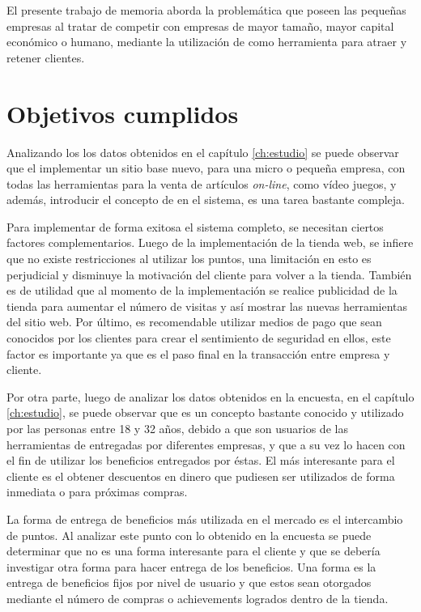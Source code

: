 El presente trabajo de memoria aborda la problemática que poseen las pequeñas
empresas al tratar de competir con empresas de mayor tamaño, mayor capital
económico o humano, mediante la utilización de {\gam} como herramienta para atraer
y retener clientes.

\section{Objetivos cumplidos}

Analizando los los datos obtenidos en el capítulo \ref{ch:estudio} se puede observar que el
implementar un sitio base nuevo, para una micro o pequeña empresa, con todas las
herramientas para la venta de artículos \emph{on-line}, como vídeo juegos, y además,
introducir el concepto de {\gam} en el sistema, es una tarea bastante compleja.

Para implementar de forma exitosa el sistema completo, se necesitan ciertos factores
complementarios. Luego de la implementación de la tienda web,
se infiere que no existe restricciones al utilizar los puntos, una limitación
en esto es perjudicial y disminuye la motivación del cliente para volver a la tienda.
También es de utilidad que al momento de la implementación se realice publicidad
de la tienda para aumentar el número de visitas y así mostrar las nuevas herramientas
del sitio web. Por último, es recomendable utilizar medios de pago que sean conocidos
por los clientes para crear el sentimiento de seguridad en ellos, este factor es importante
ya que es el paso final en la transacción entre empresa y cliente.

Por otra parte, luego de analizar los datos obtenidos en la encuesta, en el capítulo \ref{ch:estudio},
 se puede observar que {\gam} es un concepto bastante conocido y utilizado por las personas
entre 18 y 32 años, debido a que son usuarios de las herramientas de {\gam} entregadas por
diferentes empresas, y que a su vez lo hacen con el fin de utilizar los beneficios entregados
por éstas. El más interesante para el cliente es el obtener descuentos en dinero
que pudiesen ser utilizados de forma inmediata o para próximas compras.

La forma de entrega de beneficios más utilizada en el mercado es el intercambio de puntos.
Al analizar este punto con lo obtenido en la encuesta se puede determinar que no es
una forma interesante para el cliente y que se debería investigar otra forma para
hacer entrega de los beneficios. Una forma es la entrega de beneficios fijos por nivel
de usuario y que estos sean otorgados mediante el número de compras o achievements logrados
dentro de la tienda.

